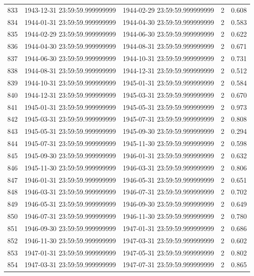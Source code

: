 \begin{table}
\begin{tabular}{lcccc}
833 & 1943-12-31 23:59:59.999999999 & 1944-02-29 23:59:59.999999999 & 2 & 0.608 \\
834 & 1944-01-31 23:59:59.999999999 & 1944-04-30 23:59:59.999999999 & 2 & 0.583 \\
835 & 1944-02-29 23:59:59.999999999 & 1944-06-30 23:59:59.999999999 & 2 & 0.622 \\
836 & 1944-04-30 23:59:59.999999999 & 1944-08-31 23:59:59.999999999 & 2 & 0.671 \\
837 & 1944-06-30 23:59:59.999999999 & 1944-10-31 23:59:59.999999999 & 2 & 0.731 \\
838 & 1944-08-31 23:59:59.999999999 & 1944-12-31 23:59:59.999999999 & 2 & 0.512 \\
839 & 1944-10-31 23:59:59.999999999 & 1945-01-31 23:59:59.999999999 & 2 & 0.584 \\
840 & 1944-12-31 23:59:59.999999999 & 1945-03-31 23:59:59.999999999 & 2 & 0.670 \\
841 & 1945-01-31 23:59:59.999999999 & 1945-05-31 23:59:59.999999999 & 2 & 0.973 \\
842 & 1945-03-31 23:59:59.999999999 & 1945-07-31 23:59:59.999999999 & 2 & 0.808 \\
843 & 1945-05-31 23:59:59.999999999 & 1945-09-30 23:59:59.999999999 & 2 & 0.294 \\
844 & 1945-07-31 23:59:59.999999999 & 1945-11-30 23:59:59.999999999 & 2 & 0.598 \\
845 & 1945-09-30 23:59:59.999999999 & 1946-01-31 23:59:59.999999999 & 2 & 0.632 \\
846 & 1945-11-30 23:59:59.999999999 & 1946-03-31 23:59:59.999999999 & 2 & 0.806 \\
847 & 1946-01-31 23:59:59.999999999 & 1946-05-31 23:59:59.999999999 & 2 & 0.651 \\
848 & 1946-03-31 23:59:59.999999999 & 1946-07-31 23:59:59.999999999 & 2 & 0.702 \\
849 & 1946-05-31 23:59:59.999999999 & 1946-09-30 23:59:59.999999999 & 2 & 0.649 \\
850 & 1946-07-31 23:59:59.999999999 & 1946-11-30 23:59:59.999999999 & 2 & 0.780 \\
851 & 1946-09-30 23:59:59.999999999 & 1947-01-31 23:59:59.999999999 & 2 & 0.686 \\
852 & 1946-11-30 23:59:59.999999999 & 1947-03-31 23:59:59.999999999 & 2 & 0.602 \\
853 & 1947-01-31 23:59:59.999999999 & 1947-05-31 23:59:59.999999999 & 2 & 0.802 \\
854 & 1947-03-31 23:59:59.999999999 & 1947-07-31 23:59:59.999999999 & 2 & 0.865 \\

\end{tabular}
\end{table}
